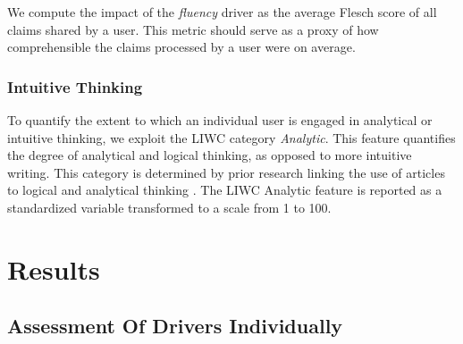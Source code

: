\documentclass[
10pt, %
a4paper, %
oneside, %
headinclude,footinclude, %
] {book}%
\begin{document}
We compute the impact of the \emph{fluency} driver as the average Flesch score of all claims shared by a user. This metric should serve as a proxy of how comprehensible the claims processed by a user were on average. 



\subsection{Intuitive Thinking}



To quantify the extent to which an individual user is engaged in analytical or intuitive thinking, we exploit the LIWC category \emph{Analytic}. This feature quantifies the degree of analytical and logical thinking, as opposed to more intuitive writing. This category is determined by prior research linking the use of articles to logical and analytical thinking \citep{pennebaker2014small}. The LIWC Analytic feature is reported as a standardized variable transformed to a scale from 1 to 100.

\chapter{Results} \label{results}

\section{Assessment Of Drivers Individually}
\end{document}
